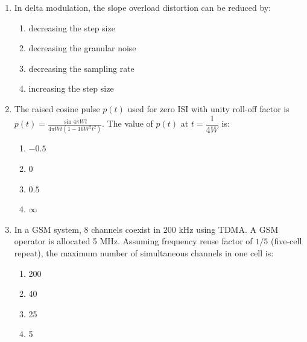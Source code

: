 \documentclass[journal,12pt,onecolumn]{IEEEtran}
\theoremstyle{remark}
\begin{document}
\begin{enumerate}
    The transfer function $\dfrac{\omega(s)}{u(s)}$ is: 
\hfill{}
\begin{multicols}{4}
\begin{enumerate}
    \item $\dfrac{10}{s^2+11s+11}$
    \item $\dfrac{1}{s^2+11s+11}$
    \item $\dfrac{10s+10}{s^2+11s+11}$
    \item $\dfrac{1}{s^2+s+1}$
\end{enumerate}
\end{multicols}

\item In delta modulation, the slope overload distortion can be reduced by: 
\hfill{}
\begin{enumerate}
    \item decreasing the step size
    \item decreasing the granular noise
    \item decreasing the sampling rate
    \item increasing the step size
\end{enumerate}

\item The raised cosine pulse $p(t)$ used for zero ISI with unity roll-off factor is
$
p(t)=\frac{\sin 4\pi W t}{4\pi W t(1-16W^2 t^2)}.
$
The value of $p(t)$ at $t=\dfrac{1}{4W}$ is:
\hfill{}
\begin{multicols}{4}
\begin{enumerate}
    \item $-0.5$
    \item $0$
    \item $0.5$
    \item $\infty$
\end{enumerate}
\end{multicols}

\item In a GSM system, 8 channels coexist in 200 kHz using TDMA. A GSM operator is allocated 5 MHz. Assuming frequency reuse factor of $1/5$ (five-cell repeat), the maximum number of simultaneous channels in one cell is: 

\hfill{}
\begin{multicols}{4}
\begin{enumerate}
  \item 200
  \item 40
  \item 25
  \item 5
\end{enumerate}
\end{multicols}


\end{enumerate}
\end{document}
